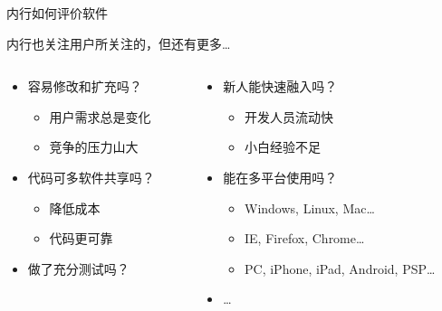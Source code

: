 \begin{frame}{内行如何评价软件}
  \begin{block}{}
    内行也关注用户所关注的，但还有更多\dots
  \end{block}
  \begin{columns}[t]
    \begin{column}{.5\paperwidth}
      \begin{itemize}
        \pause
        \item 容易修改和扩充吗？\structure{[扩展性]}
          \begin{itemize}
            \item 用户需求总是变化
            \item 竞争的压力山大
          \end{itemize}
        \pause
        \item 代码可多软件共享吗？\structure{[复用性]}
          \begin{itemize}
            \item 降低成本
            \item 代码更可靠
          \end{itemize}
        \pause
        \item 做了充分测试吗？\structure{[可测性]}
        \pause
      \end{itemize}
    \end{column}
    \begin{column}{.5\paperwidth}
      \begin{itemize}
        \item 新人能快速融入吗？\structure{[可维护]}
          \begin{itemize}
            \item 开发人员流动快
            \item 小白经验不足
          \end{itemize}
        \pause
        \item 能在多平台使用吗？\structure{[可移植性]}
          \begin{itemize}
            \pause
            \item Windows, Linux, Mac\dots
            \pause
            \item IE, Firefox, Chrome\dots
            \pause
            \item PC, iPhone, iPad, Android, PSP\dots
          \end{itemize}
        \pause
        \item \dots
      \end{itemize}
    \end{column}
  \end{columns}
\end{frame}

